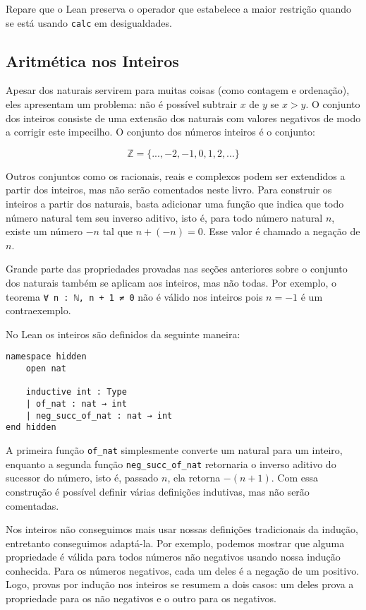 Repare que o Lean preserva o operador que estabelece a maior restrição quando se está usando \lstinline{calc} em desigualdades.

\subsection{Aritmética nos Inteiros}

Apesar dos naturais servirem para muitas coisas (como contagem e ordenação), eles apresentam um problema: não é possível subtrair $x$ de $y$ se $x > y$. O conjunto dos inteiros consiste de uma extensão dos naturais com valores negativos de modo a corrigir este impecilho. O conjunto dos números inteiros é o conjunto:

\[ \mathbb{Z} = \{...,-2,-1,0,1,2,...\}\]

Outros conjuntos como os racionais, reais e complexos podem ser extendidos a partir dos inteiros, mas não serão comentados neste livro. Para construir os inteiros a partir dos naturais, basta adicionar uma função que indica que todo número natural tem seu inverso aditivo, isto é, para todo número natural $n$, existe um número $-n$ tal que $n+(-n)=0$. Esse valor é chamado a negação de $n$.

Grande parte das propriedades provadas nas seções anteriores sobre o conjunto dos naturais também se aplicam aos inteiros, mas não todas. Por exemplo, o teorema \lstinline{∀ n : ℕ, n + 1 ≠ 0} não é válido nos inteiros pois $n=-1$ é um contraexemplo.

No Lean os inteiros são definidos da seguinte maneira:

\begin{lstlisting}
namespace hidden
    open nat

    inductive int : Type
    | of_nat : nat → int
    | neg_succ_of_nat : nat → int
end hidden
\end{lstlisting}

A primeira função \lstinline{of_nat} simplesmente converte um natural para um inteiro, enquanto a segunda função \lstinline{neg_succ_of_nat} retornaria o inverso aditivo do sucessor do número, isto é, passado $n$, ela retorna $-(n+1)$. Com essa construção é possível definir várias definições indutivas, mas não serão comentadas.

Nos inteiros não conseguimos mais usar nossas definições tradicionais da indução, entretanto conseguimos adaptá-la. Por exemplo, podemos mostrar que alguma propriedade é válida para todos números não negativos usando nossa indução conhecida. Para os números negativos, cada um deles é a negação de um positivo. Logo, provas por indução nos inteiros se resumem a dois casos: um deles prova a propriedade para os não negativos e o outro para os negativos.

